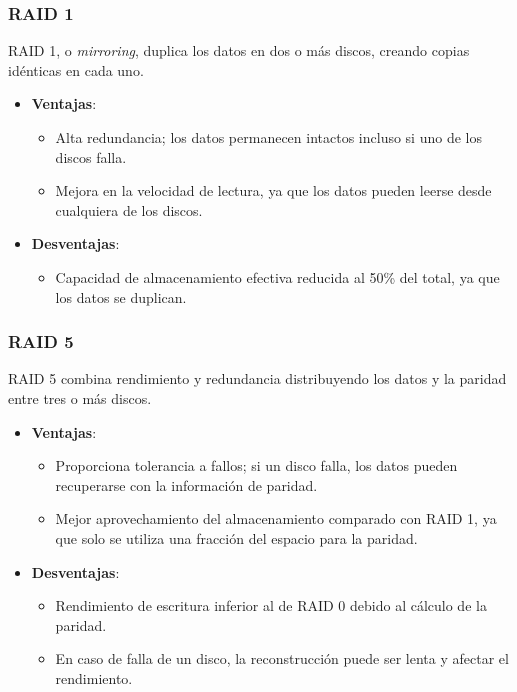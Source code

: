 \subsubsection{RAID 1}

RAID 1, o \textit{mirroring}, duplica los datos en dos o más discos, creando copias idénticas en cada uno.

\begin{itemize}
  \item \textbf{Ventajas}:
    \begin{itemize}
      \item Alta redundancia; los datos permanecen intactos incluso si uno de los discos falla.
      \item Mejora en la velocidad de lectura, ya que los datos pueden leerse desde cualquiera de los discos.
    \end{itemize}
  \item \textbf{Desventajas}:
    \begin{itemize}
      \item Capacidad de almacenamiento efectiva reducida al 50\% del total, ya que los datos se duplican.
    \end{itemize}
\end{itemize}

\subsubsection{RAID 5}

RAID 5 combina rendimiento y redundancia distribuyendo los datos y la paridad entre tres o más discos.

\begin{itemize}
  \item \textbf{Ventajas}:
    \begin{itemize}
      \item Proporciona tolerancia a fallos; si un disco falla, los datos pueden recuperarse con la información de paridad.
      \item Mejor aprovechamiento del almacenamiento comparado con RAID 1, ya que solo se utiliza una fracción del espacio para la paridad.
    \end{itemize}
  \item \textbf{Desventajas}:
    \begin{itemize}
      \item Rendimiento de escritura inferior al de RAID 0 debido al cálculo de la paridad.
      \item En caso de falla de un disco, la reconstrucción puede ser lenta y afectar el rendimiento.
    \end{itemize}
\end{itemize}

